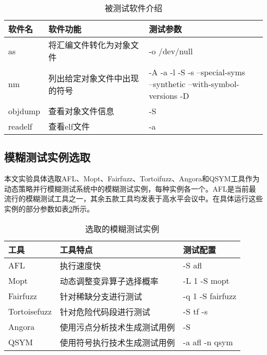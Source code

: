 \documentclass[master]{thesis-uestc}
\begin{document}
\begin{table}[!htbp]
    \caption{被测试软件介绍}
    \begin{tabular}{lll}
    \toprule
    软件名 & 软件功能 & 测试参数 \\
    \midrule
    as & 将汇编文件转化为对象文件 & -o /dev/null \\
    nm & 列出给定对象文件中出现的符号 & \makecell[l]{-A -a -l -S -s --special-syms \\--synthetic --with-symbol-versions -D}  \\
    objdump & 查看对象文件信息 & -S \\
    readelf & 查看elf文件 & -a \\
    \bottomrule
    \end{tabular}
    \label{table_targets}
    \vspace{6pt}
\end{table}


\subsection{模糊测试实例选取}

本文实验具体选取AFL、Mopt、Fairfuzz、Tortoifuzz、Angora和QSYM工具作为动态策略并行模糊测试系统中的模糊测试实例，每种实例各一个。AFL是当前最流行的模糊测试工具之一，其余五款工具均发表于高水平会议中。在具体运行这些实例的部分参数如表\ref{table_instances}所示。

\begin{table}[!htbp]
    \caption{选取的模糊测试实例}
    \begin{tabular}{lll}
    \toprule
    工具 & 工具特点 & 测试配置 \\
    \midrule
    AFL & 执行速度快 & -S afl \\
    Mopt & 动态调整变异算子选择概率 & -L 1 -S mopt \\
    Fairfuzz & 针对稀缺分支进行测试 & -q 1 -S fairfuzz \\
    Tortoisefuzz & 针对危险代码段进行测试 & -S tf -s \\
    Angora & 使用污点分析技术生成测试用例 & -S \\
    QSYM & 使用符号执行技术生成测试用例 & -a afl -n qsym \\
    \bottomrule
    \end{tabular}
    \label{table_instances}
    \vspace{6pt}
\end{table}
\end{document}
